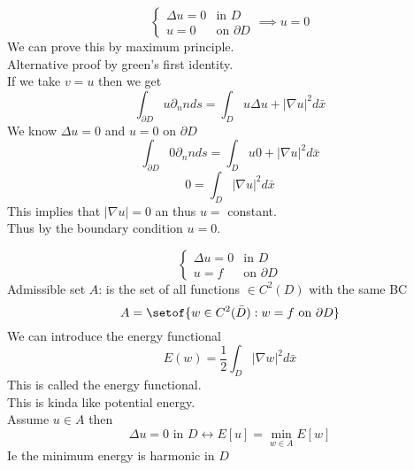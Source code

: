 \documentclass[answers,12pt,addpoints]{exam}
\begin{document}
\begin{theorem}
    $$\begin{cases}
        \Delta u = 0 & \text{in } D\\
        u = 0 & \text{on } \partial D
    \end{cases} \implies u = 0$$
    We can prove this by maximum principle.\\
    Alternative proof by green's first identity.\\
    If we take $v = u$ then we get
    $$ \int_{\partial D} u \partial_n n ds = \int_D u \Delta u + |\nabla u|^2 d\bar{x}$$
    We know $\Delta u = 0$ and $u = 0$ on $\partial D$\\
    $$\int_{\partial D} 0 \partial_n n ds = \int_D u 0 + |\nabla u|^2 d\bar{x}$$ 
    $$ 0 = \int_D |\nabla u|^2 d\bar{x}$$
    This implies that $|\nabla u| = 0$ an thus $u = $ constant.\\
    Thus by the boundary condition $u = 0$.
\end{theorem}
\begin{theorem}
    $$\begin{cases}
        \Delta u = 0 & \text{in } D\\
        u = f & \text{on } \partial D
    \end{cases}$$
    Admissible set $A$: is the set of all functions $\in C^2(D)$ with the same BC \\
    $$A = \setof{w \in C^2(\bar{D}): w = f \text{ on } \partial D}$$
    We can introduce the energy functional
    $$E(w) = \frac{1}{2} \int_D |\nabla w|^2 d\bar{x}$$
    This is called the energy functional.\\
    This is kinda like potential energy.\\
    Assume $u \in A$ then \\
    $$ \Delta u = 0 \text{ in } D \leftrightarrow E[u] = \min_{w \in A} E[w]$$
    Ie the minimum energy is harmonic in $D$\\
\end{theorem}
\end{document}
